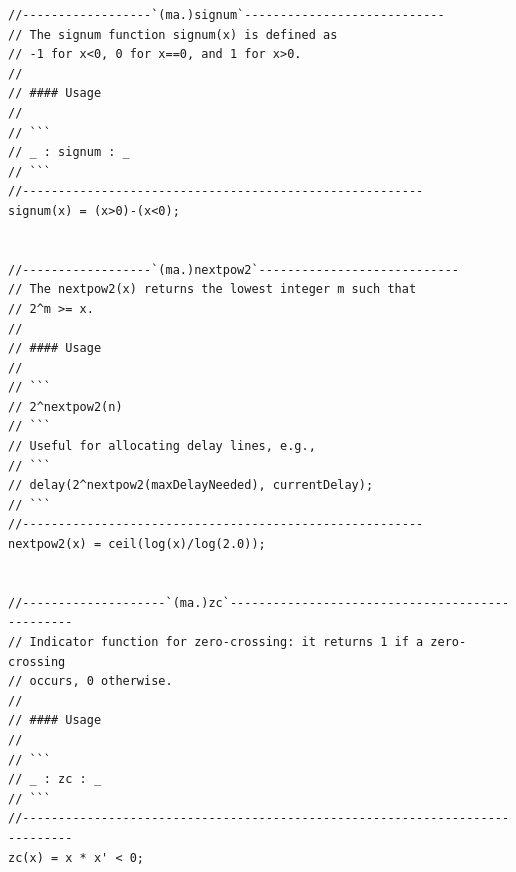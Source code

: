 \documentclass{article}
\begin{document}
\begin{lstlisting}[caption=\texttt{maths.lib}]
//------------------`(ma.)signum`----------------------------
// The signum function signum(x) is defined as
// -1 for x<0, 0 for x==0, and 1 for x>0.
//
// #### Usage
//
// ```
// _ : signum : _
// ```
//--------------------------------------------------------
signum(x) = (x>0)-(x<0);


//------------------`(ma.)nextpow2`----------------------------
// The nextpow2(x) returns the lowest integer m such that
// 2^m >= x.
//
// #### Usage
//
// ```
// 2^nextpow2(n)
// ```
// Useful for allocating delay lines, e.g., 
// ```
// delay(2^nextpow2(maxDelayNeeded), currentDelay);
// ```
//--------------------------------------------------------
nextpow2(x) = ceil(log(x)/log(2.0));


//--------------------`(ma.)zc`------------------------------------------------
// Indicator function for zero-crossing: it returns 1 if a zero-crossing
// occurs, 0 otherwise.
//
// #### Usage
//
// ```
// _ : zc : _
// ```
//-----------------------------------------------------------------------------
zc(x) = x * x' < 0;

\end{lstlisting}
\end{document}
